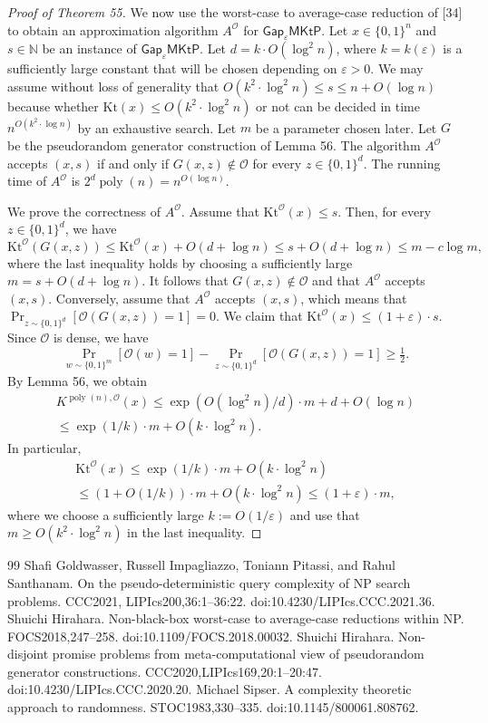 \documentclass[10pt,a4paper]{article}
\begin{document}
\begin{proof}[Proof of Theorem 55]
We now use the worst-case to average-case reduction of [34] to obtain an approximation algorithm $A^{\mathcal O}$ for $\mathsf{Gap}_{\varepsilon}\mathsf{MKtP}$. Let $x\in\{0,1\}^n$ and $s\in\mathbb N$ be an instance of $\mathsf{Gap}_{\varepsilon}\mathsf{MKtP}$. Let $d=k\cdot O(\log^2 n)$, where $k=k(\varepsilon)$ is a sufficiently large constant that will be chosen depending on $\varepsilon>0$. We may assume without loss of generality that $O(k^2\cdot\log^2 n)\leq s\leq n+O(\log n)$ because whether $\mathrm{Kt}(x)\leq O(k^2\cdot\log^2 n)$ or not can be decided in time $n^{O(k^2\cdot\log n)}$ by an exhaustive search. Let $m$ be a parameter chosen later. Let $G$ be the pseudorandom generator construction of Lemma 56. The algorithm $A^{\mathcal O}$ accepts $(x,s)$ if and only if $G(x,z)\notin\mathcal O$ for every $z\in\{0,1\}^d$. The running time of $A^{\mathcal O}$ is $2^d\operatorname{poly}(n)=n^{O(\log n)}$.

We prove the correctness of $A^{\mathcal O}$. Assume that $\mathrm{Kt}^{\mathcal O}(x)\leq s$. Then, for every $z\in\{0,1\}^d$, we have
\[\mathrm{Kt}^{\mathcal O}(G(x,z))\leq\mathrm{Kt}^{\mathcal O}(x)+O(d+\log n)\leq s+O(d+\log n)\leq m-c\log m,\]
where the last inequality holds by choosing a sufficiently large $m=s+O(d+\log n)$. It follows that $G(x,z)\notin\mathcal O$ and that $A^{\mathcal O}$ accepts $(x,s)$. Conversely, assume that $A^{\mathcal O}$ accepts $(x,s)$, which means that $\Pr_{z\sim\{0,1\}^d}[\mathcal O(G(x,z))=1]=0$. We claim that $\mathrm{Kt}^{\mathcal O}(x)\leq(1+\varepsilon)\cdot s$. Since $\mathcal O$ is dense, we have
\[\Pr_{w\sim\{0,1\}^m}[\mathcal O(w)=1]-\Pr_{z\sim\{0,1\}^d}[\mathcal O(G(x,z))=1]\geq\tfrac12.\]
By Lemma 56, we obtain
\begin{multline*}
K^{\operatorname{poly}(n),\mathcal O}(x)\leq\exp(O(\log^2 n)/d)\cdot m+d+O(\log n)\\
\leq\exp(1/k)\cdot m+O(k\cdot\log^2 n).
\end{multline*}
In particular,
\begin{multline*}
\mathrm{Kt}^{\mathcal O}(x)\leq\exp(1/k)\cdot m+O(k\cdot\log^2 n)\\
\leq(1+O(1/k))\cdot m+O(k\cdot\log^2 n)\leq(1+\varepsilon)\cdot m,
\end{multline*}
where we choose a sufficiently large $k:=O(1/\varepsilon)$ and use that $m\geq O(k^2\cdot\log^2 n)$ in the last inequality.
\end{proof}

\begin{thebibliography}{99}
 Shafi Goldwasser, Russell Impagliazzo, Toniann Pitassi, and Rahul Santhanam. On the pseudo-deterministic query complexity of NP search problems. CCC2021, LIPIcs200,36:1--36:22. doi:10.4230/LIPIcs.CCC.2021.36.
 Shuichi Hirahara. Non-black-box worst-case to average-case reductions within NP. FOCS2018,247--258. doi:10.1109/FOCS.2018.00032.
 Shuichi Hirahara. Non-disjoint promise problems from meta-computational view of pseudorandom generator constructions. CCC2020,LIPIcs169,20:1--20:47. doi:10.4230/LIPIcs.CCC.2020.20.
 Michael Sipser. A complexity theoretic approach to randomness. STOC1983,330--335. doi:10.1145/800061.808762.
\end{thebibliography}
\end{document}
